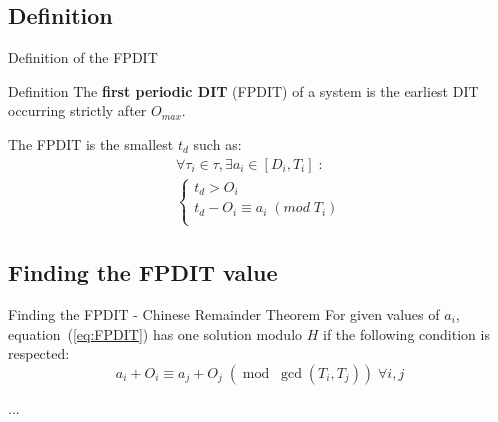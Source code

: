 \documentclass{beamer}
\begin{document}
    \begin{frame}
    \end{frame}

	\subsection{Definition}

	\begin{frame}{Definition of the FPDIT}
		\begin{block}{Definition}
			The \textbf{first periodic DIT} (FPDIT) of a system is the earliest DIT occurring
			strictly after $O_{max}$.
		\end{block}

        The FPDIT is the smallest $t_d$ such as:
       \begin{equation}
            \begin{array}{l}
                \forall \tau_i \in \tau, \exists a_i \in [D_i,T_i] \; :\\
                \left\{
                    \begin{array}{l}
                        t_d > O_i \\
                        t_d - O_i \equiv a_i \; (mod \; T_i)
                        \\
                    \end{array}
                \right.
            \end{array}
            \label{eq:FPDIT}
        \end{equation}

	\end{frame}

	\subsection{Finding the FPDIT value}

    \begin{frame}{Finding the FPDIT - Chinese Remainder Theorem}
        For given values of $a_i$, equation~(\ref{eq:FPDIT}) has one solution modulo $H$ if the following condition is respected:
        \[
            a_i + O_i \equiv a_j + O_j \; (\operatorname{mod} \; \operatorname{gcd}(T_i,
            T_j)) \; \forall i,j
        \]

        ...
    \end{frame}
\end{document}
